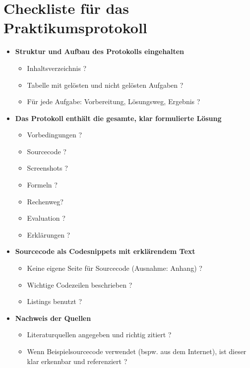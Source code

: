 \newpage
\section{Checkliste für das Praktikumsprotokoll}

\begin{itemize}
	\item[\Square] \textbf{Struktur und Aufbau des Protokolls eingehalten}
	\begin{itemize}
		\item Inhaltsverzeichnis ?
		\item Tabelle mit gelösten und nicht gelösten Aufgaben ?
		\item Für jede Aufgabe: Vorbereitung, Lösungsweg, Ergebnis ?
	\end{itemize}
	\item[\Square] \textbf{Das Protokoll enthält die gesamte, klar formulierte Lösung}
	\begin{itemize}
		\item Vorbedingungen ?
		\item Sourcecode ?
		\item Screenshots ?
		\item Formeln ?
		\item Rechenweg?
		\item Evaluation ?
		\item Erklärungen ?
	\end{itemize}
	\item[\Square] \textbf{Sourcecode als Codesnippets mit erklärendem Text}
	\begin{itemize}
		\item Keine eigene Seite für Sourcecode (Ausnahme: Anhang) ?
		\item Wichtige Codezeilen beschrieben ?
		\item Listings benutzt ?
	\end{itemize}
	\item[\Square] \textbf{Nachweis der Quellen}
	\begin{itemize}
		\item Literaturquellen angegeben und richtig zitiert ?
		\item Wenn Beispielsourcecode verwendet (bspw. aus dem Internet), ist dieser klar erkennbar und referenziert ?
	\end{itemize}
\end{itemize}